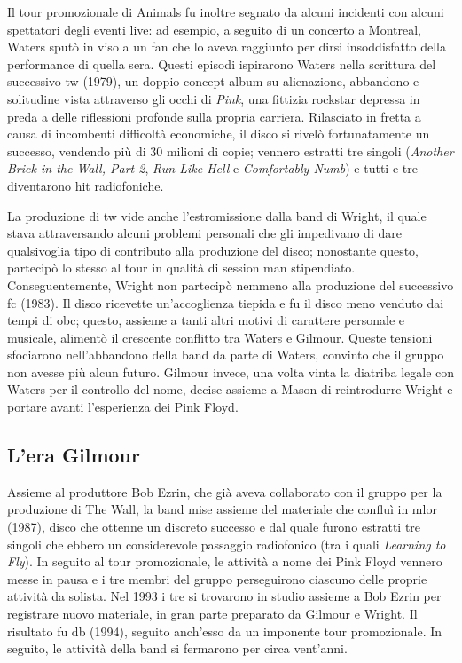 \documentclass[class=book, crop=false, oneside, 12pt]{standalone}
\begin{document}
    Il tour promozionale di Animals fu inoltre segnato da alcuni incidenti con alcuni spettatori degli eventi live: ad esempio, a seguito di un concerto a Montreal, Waters sputò in viso a un fan che lo aveva raggiunto per dirsi insoddisfatto della performance di quella sera. Questi episodi ispirarono Waters nella scrittura del successivo \acrfull{tw} (1979), un doppio concept album su alienazione, abbandono e solitudine vista attraverso gli occhi di \emph{Pink}, una fittizia rockstar depressa in preda a delle riflessioni profonde sulla propria carriera. Rilasciato in fretta a causa di incombenti difficoltà economiche, il disco si rivelò fortunatamente un successo, vendendo più di 30 milioni di copie; vennero estratti tre singoli (\emph{Another Brick in the Wall, Part 2}, \emph{Run Like Hell} e \emph{Comfortably Numb}) e tutti e tre diventarono hit radiofoniche. 
    
    La produzione di \acrshort{tw} vide anche l'estromissione dalla band di Wright, il quale stava attraversando alcuni problemi personali che gli impedivano di dare qualsivoglia tipo di contributo alla produzione del disco; nonostante questo, partecipò lo stesso al tour in qualità di session man stipendiato. Conseguentemente, Wright non partecipò nemmeno alla produzione del successivo \acrfull{fc} (1983). Il disco ricevette un'accoglienza tiepida e fu il disco meno venduto dai tempi di \acrshort{obc}; questo, assieme a tanti altri motivi di carattere personale e musicale, alimentò il crescente conflitto tra Waters e Gilmour. Queste tensioni sfociarono nell'abbandono della band da parte di Waters, convinto che il gruppo non avesse più alcun futuro. Gilmour invece, una volta vinta la diatriba legale con Waters per il controllo del nome, decise assieme a Mason di reintrodurre Wright e portare avanti l'esperienza dei Pink Floyd.

    \subsection{L'era Gilmour}
    Assieme al produttore Bob Ezrin, che già aveva collaborato con il gruppo per la produzione di The Wall, la band mise assieme del materiale che confluì in \acrfull{mlor} (1987), disco che ottenne un discreto successo e dal quale furono estratti tre singoli che ebbero un considerevole passaggio radiofonico (tra i quali \emph{Learning to Fly}). In seguito al tour promozionale, le attività a nome dei Pink Floyd vennero messe in pausa  e i tre membri del gruppo perseguirono ciascuno delle proprie attività da solista. Nel 1993 i tre si trovarono in studio assieme a Bob Ezrin per registrare nuovo materiale, in gran parte preparato da Gilmour e Wright. Il risultato fu \acrfull{db} (1994), seguito anch'esso da un imponente tour promozionale. In seguito, le attività della band si fermarono per circa vent'anni.
\end{document}
